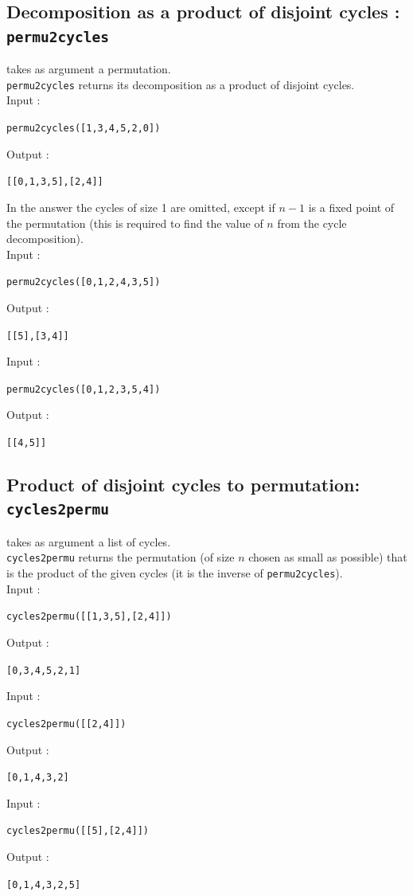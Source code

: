 \documentclass[a4paper,11pt]{book}
\begin{document}
\subsection{Decomposition as a product of disjoint cycles :
{\tt permu2cycles}}
 takes as argument a permutation.\\
{\tt permu2cycles} returns its decomposition as a product of
disjoint cycles.\\
Input :
\begin{center}{\tt permu2cycles([1,3,4,5,2,0])}\end{center}
Output :
\begin{center}{\tt [[0,1,3,5],[2,4]]}\end{center}
In the answer the cycles of size 1 are omitted, except if $n-1$ is a
fixed point of the permutation (this is required to find the value of
$n$ from the cycle decomposition).\\
Input :
\begin{center}{\tt permu2cycles([0,1,2,4,3,5])}\end{center}
Output :
\begin{center}{\tt [[5],[3,4]]}\end{center}
Input :
\begin{center}{\tt permu2cycles([0,1,2,3,5,4])}\end{center}
Output :
\begin{center}{\tt [[4,5]]}\end{center}

\subsection{Product of disjoint cycles to permutation: {\tt cycles2permu}}
 takes as argument a list of cycles.\\
{\tt cycles2permu} returns the permutation (of size $n$ chosen as small as 
possible) that is the product of the given cycles 
(it is the inverse of {\tt permu2cycles}).\\
Input :
\begin{center}{\tt cycles2permu([[1,3,5],[2,4]])}\end{center}
Output :
\begin{center}{\tt [0,3,4,5,2,1]}\end{center}
Input :
\begin{center}{\tt cycles2permu([[2,4]])}\end{center}
Output :
\begin{center}{\tt [0,1,4,3,2]}\end{center}
Input :
\begin{center}{\tt cycles2permu([[5],[2,4]])}\end{center}
Output :
\begin{center}{\tt [0,1,4,3,2,5]}\end{center}
\end{document}
